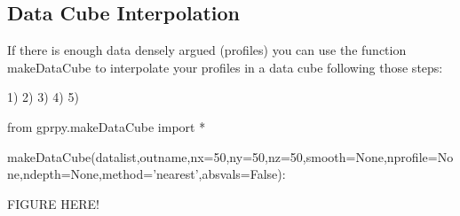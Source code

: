 \documentclass[12pt]{article}
\begin{document}
	\subsection{Data Cube Interpolation}
	
	If there is enough data densely argued (profiles) you can use the function makeDataCube to interpolate your profiles in a data cube following those steps:


1)
2)
3)
4)
5)

from gprpy.makeDataCube import *

 makeDataCube(datalist,outname,nx=50,ny=50,nz=50,smooth=None,nprofile=None,ndepth=None,method='nearest',absvals=False):

												FIGURE HERE!
\end{document}
